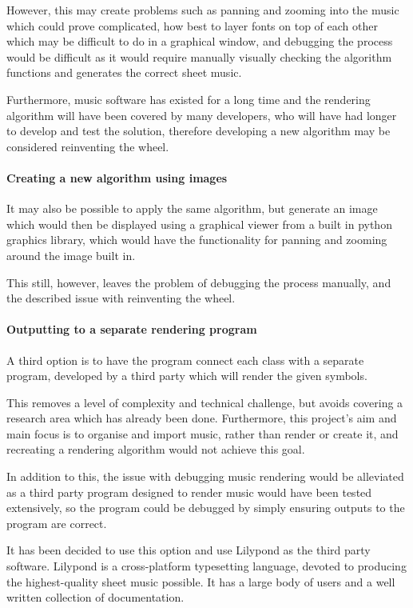However, this may create problems such as panning and zooming into the music which could prove complicated, how best to layer fonts on top of each other which may be difficult to do in a graphical window, and debugging the process would be difficult as it would require manually visually checking the algorithm functions and generates the correct sheet music.

Furthermore, music software has existed for a long time and the rendering algorithm will have been covered by many developers, who will have had longer to develop and test the solution, therefore developing a new algorithm may be considered reinventing the wheel.

\paragraph{Creating a new algorithm using images}
It may also be possible to apply the same algorithm, but generate an image which would then be displayed using a graphical viewer from a built in python graphics library, which would have the functionality for panning and zooming around the image built in. 

This still, however, leaves the problem of debugging the process manually, and the described issue with reinventing the wheel.

\paragraph{Outputting to a separate rendering program}
A third option is to have the program connect each class with a separate program, developed by a third party which will render the given symbols.

This removes a level of complexity and technical challenge, but avoids covering a research area which has already been done. Furthermore, this project's aim and main focus is to organise and import music, rather than render or create it, and recreating a rendering algorithm would not achieve this goal.

In addition to this, the issue with debugging music rendering would be alleviated as a third party program designed to render music would have been tested extensively, so the program could be debugged by simply ensuring outputs to the program are correct.

It has been decided to use this option and use Lilypond as the third party software. Lilypond is a cross-platform typesetting language, devoted to producing the highest-quality sheet music possible. \parencite{Lilypond} It has a large body of users and a well written collection of documentation. 

